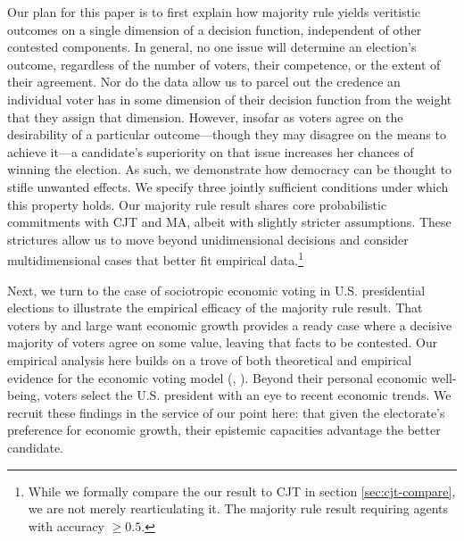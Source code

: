 \documentclass[11pt]{article}
\begin{document}
Our plan for this paper is to first explain how majority rule
yields veritistic outcomes on a single dimension of a decision
function, independent of other contested components.
In general, no one issue will determine an election's outcome, regardless of the number of voters, their competence, or the extent of their agreement. Nor do the data allow us to parcel out the credence an individual voter has in some dimension of their decision function from the weight that they assign that dimension.
However, insofar as voters agree on the desirability of a particular outcome---though they may disagree on the means to achieve it---a candidate's superiority on that issue increases her chances of winning the election. As such, we demonstrate how democracy can be thought to stifle unwanted effects.
We specify three jointly sufficient conditions under which this property holds.
Our majority rule result shares  core probabilistic commitments with CJT and MA, albeit with slightly stricter assumptions. These strictures allow us to move beyond unidimensional decisions and consider multidimensional cases that better fit empirical data.\footnote{While we formally compare the our result to  CJT in section \ref{sec:cjt-compare}, we are not merely rearticulating it. The majority rule result requiring agents with accuracy $\ge 0.5$. }

Next, we turn to the case of sociotropic economic voting in U.S. presidential elections to illustrate the empirical efficacy of the majority rule result. That voters by and large want economic growth provides a ready case where a decisive majority of voters agree on some value, leaving that facts to be contested.
 Our empirical analysis here builds on a trove of both theoretical and empirical evidence for the economic voting model (\cite{Duch2008}, \cite{Revisited09}). Beyond their personal economic well-being, voters select the U.S. president with an eye to recent economic trends. We recruit these findings in the service of our point here: that given the electorate's preference for economic growth, their epistemic capacities advantage the better candidate.


\end{document}

